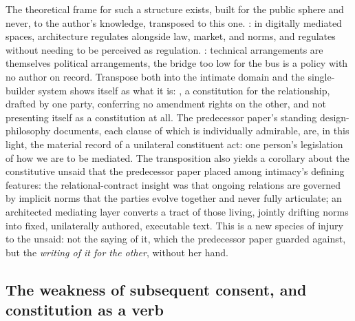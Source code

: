 The theoretical frame for such a structure exists, built for the public sphere and never, to the author's knowledge, transposed to this one. \textcite{lessig2006code}: in digitally mediated spaces, architecture regulates alongside law, market, and norms, and regulates without needing to be perceived as regulation. \textcite{winner1980artifacts}: technical arrangements are themselves political arrangements, the bridge too low for the bus is a policy with no author on record. Transpose both into the intimate domain and the single-builder system shows itself as what it is: , a constitution for the relationship, drafted by one party, conferring no amendment rights on the other, and not presenting itself as a constitution at all. The predecessor paper's standing design-philosophy documents, each clause of which is individually admirable, are, in this light, the material record of a unilateral constituent act: one person's legislation of how we are to be mediated. The transposition also yields a corollary about the constitutive unsaid that the predecessor paper placed among intimacy's defining features: the relational-contract insight \parencite{macneil1980new} was that ongoing relations are governed by implicit norms that the parties evolve together and never fully articulate; an architected mediating layer converts a tract of those living, jointly drifting norms into fixed, unilaterally authored, executable text. This is a new species of injury to the unsaid: not the saying of it, which the predecessor paper guarded against, but the \emph{writing of it for the other}, without her hand.

\subsection{The weakness of subsequent consent, and constitution as a verb}
\label{p02:sec:power-consent}

